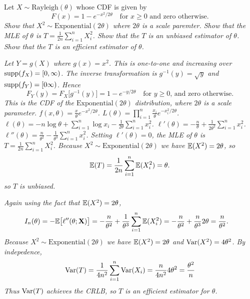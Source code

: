 \begin{exercise}
\begin{questions}
\question %
Let $X\sim\text{Rayleigh}(\theta)$ whose CDF is given by
\[
F(x) = 1 - e^{-x^2/2\theta} \quad\text{for $x\geq 0$ and zero otherwise.}
\]
\ben
\it Show that $X^2\sim\text{Exponential}(2\theta)$ where $2\theta$ is a scale paremter.
\it Show that the MLE of $\theta$ is $\displaystyle T=\frac{1}{2n}\sum_{i=1}^n X_i^2$.
\it Show that the $T$ is an unbiased estimator of $\theta$.
\it Show that the $T$ is an efficient estimator of $\theta$.
\een
\begin{answer}
\ben
\it %
Let $Y=g(X)$ where $g(x)=x^2$. This is one-to-one and increasing over $\text{supp}(f_X)=[0,\infty)$. The inverse transformation is $g^{-1}(y) = \sqrt{y}$ and $\text{supp}(f_Y)=[0\infty)$. Hence
\[
F_Y(y) = F_X\big[g^{-1}(y)\big] = 1 - e^{-y/2\theta} \quad\text{for $y\geq 0$, and zero otherwise.}
\]
This is the CDF of the $\text{Exponential}(2\theta)$ distribution, where $2\theta$ is a scale parameter.
\it %
\bit
\it $f(x,\theta) = \displaystyle\frac{x}{\theta}e^{-x^2/2\theta}$.
\it $L(\theta) = \prod_{i=1}^n \displaystyle\frac{x_i}{\theta}e^{-x_i^2/2\theta}$.
\it $\ell(\theta) = -n\log\theta + \sum_{i=1}^n\log x_i - \displaystyle\frac{1}{2\theta}\sum_{i=1}^n x_i^2$.
\it $\ell'(\theta) = -\displaystyle\frac{n}{\theta} + \frac{1}{2\theta^2}\sum_{i=1}^n x_i^2$.
\it $\ell''(\theta) = \displaystyle\frac{n}{\theta^2} - \frac{1}{\theta^3}\sum_{i=1}^n x_i^2$.
\eit
Setting $\ell'(\theta)=0$, the MLE of $\theta$ is $\displaystyle T=\frac{1}{2n}\sum_{i=1}^n X_i^2$.
\it %
Because $X^2\sim\text{Exponential}(2\theta)$ we have $\mathbb{E}(X^2)=2\theta$, so
\[
\mathbb{E}(T) = \frac{1}{2n}\sum_{i=1}^n \mathbb{E}(X_i^2) = \theta.
\]
so $T$ is unbiased.

\it %
Again using the fact that $\mathbb{E}(X^2) = 2\theta$,
\begin{align*}
I_n(\theta) = -\mathbb{E}\big[\ell''(\theta;\mathbf{X})\big] 
	& = -\frac{n}{\theta^2} + \frac{1}{\theta^3}\sum_{i=1}^n \mathbb{E}(X_i^2)
	= -\frac{n}{\theta^2} + \frac{n}{\theta^3}2\theta	
	= \frac{n}{\theta^2}.
\end{align*}
Because $X^2\sim\text{Exponential}(2\theta)$ we have $\mathbb{E}(X^2)=2\theta$ and $\text{Var}(X^2) = 4\theta^2$. By indepedence,
\[
\text{Var}(T) = \frac{1}{4n^2}\sum_{i=1}^n\text{Var}(X_i) = \frac{n}{4n^2}4\theta^2 = \frac{\theta^2}{n}
\]
Thus $\text{Var}(T)$ achieves the CRLB, so $T$ is an efficient estimator for $\theta$. 
\een
\end{answer}


\end{questions}
\end{exercise}
